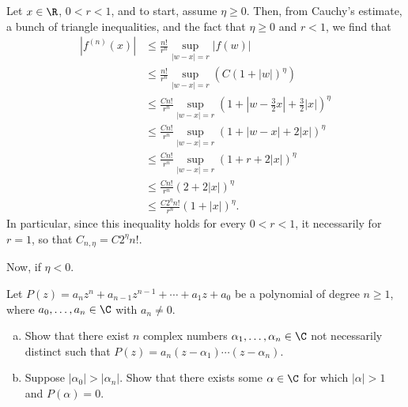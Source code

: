 \documentclass[10pt]{mypackage}
\begin{document}
\begin{solution}
  Let $x\in \R$, $0 < r < 1$, and to start, assume $\eta \geq 0$. Then, from Cauchy's estimate, a bunch of triangle inequalities, and the fact that $\eta \geq 0$ and $ r < 1 $, we find that
  \begin{align*}
    \left\vert f^{(n)}\left( x \right) \right\vert &\leq \frac{n!}{r^{n}} \sup_{\left\vert w-x \right\vert= r} \left\vert f(w) \right\vert\\
                                                   &\leq \frac{n!}{r^{n}} \sup_{\left\vert w-x \right\vert = r} \left( C\left( 1 + \left\vert w \right\vert \right)^{\eta} \right)\\
                                                   &\leq \frac{Cn!}{r^{n}} \sup_{\left\vert w-x \right\vert = r} \left( 1 + \left\vert w-\frac{3}{2} x\right\vert + \frac{3}{2}\left\vert x \right\vert \right)^{\eta}\\
                                                   &\leq \frac{Cn!}{r^{n}} \sup_{\left\vert w-x \right\vert = r} \left( 1 + \left\vert w-x \right\vert + 2\left\vert x \right\vert \right)^{\eta}\\
                                                   &\leq \frac{Cn!}{r^{n}}\sup_{\left\vert w-x \right\vert = r} \left( 1 + r + 2\left\vert x \right\vert \right)^{\eta}\\
                                                   &\leq \frac{Cn!}{r^{n}} \left( 2 + 2\left\vert x \right\vert \right)^{\eta}\\
                                                   &\leq \frac{C2^{\eta}n!}{r^{n}} \left( 1 + \left\vert x \right\vert \right)^{\eta}.
  \end{align*}
  In particular, since this inequality holds for every $0 < r < 1$, it necessarily for $r = 1$, so that $C_{n,\eta} = C2^{\eta}n!$.\newline

  Now, if $\eta < 0$.
\end{solution}
\begin{problem}[Problem 5]
  Let $P(z) = a_nz^{n} + a_{n-1}z^{n-1} + \cdots + a_1z + a_0$ be a polynomial of degree $n \geq 1$, where $a_0,\dots,a_n\in \C$ with $a_n\neq 0$.
  \begin{enumerate}[(a)]
    \item Show that there exist $n$ complex numbers $\alpha_1,\dots,\alpha_n\in\C$ not necessarily distinct such that $P(z) = a_n \left( z-\alpha_1 \right)\cdots \left( z-\alpha_n \right)$.
    \item Suppose $\left\vert \alpha_0 \right\vert > \left\vert \alpha_n \right\vert$. Show that there exists some $\alpha\in \C$ for which $\left\vert \alpha \right\vert > 1$ and $P\left(\alpha\right) = 0$.
  \end{enumerate}
\end{problem}
\end{document}
